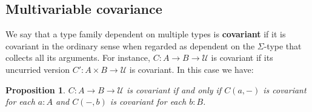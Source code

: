 \documentclass{amsart}
\theoremstyle{plain}
\newtheorem{prop}[thm]{Proposition}
\theoremstyle{definition}
\theoremstyle{remark}
\numberwithin{equation}{section}
\newcommand{\univtype}{\mathcal{U}}
\begin{document}
\subsection{Multivariable covariance}
\label{sec:mult-covar}

We say that a type family dependent on multiple types is \textbf{covariant} if it is covariant in the ordinary sense when regarded as dependent on the $\Sigma$-type that collects all its arguments.
For instance, $C:A\to B\to \univtype$ is covariant if its uncurried version $C' : A\times B \to \univtype$ is covariant.
In this case we have:

\begin{prop}\label{thm:multivar-covar}
  $C:A\to B\to \univtype$ is covariant if and only if $C(a,-)$ is covariant for each $a:A$ and $C(-,b)$ is covariant for each $b:B$.
\end{prop}
\end{document}
